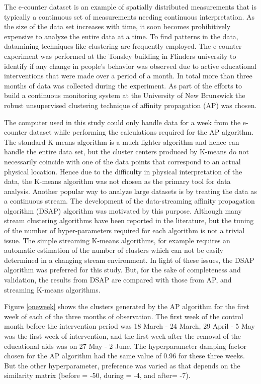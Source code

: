 The e-counter dataset is an example of spatially distributed measurements that is typically a continuous set of measurements needing continuous interpretation. As the size of the data set increases with time, it soon becomes prohibitively expensive to analyze the entire data at a time. To find patterns in the data, datamining techniques like clustering are frequently employed. The e-counter experiment was performed at the Tonsley building in Flinders university to identify if any change in people's behavior was observed due to active educational interventions that were made over a period of a month. In total more than three months of data was collected during the experiment. As part of the efforts to build a continuous monitoring system at the University of New Brunswick the robust unsupervised clustering technique of affinity propagation (AP) was chosen.

The computer used in this study could only handle data for a week from the e-counter dataset while performing the calculations required for the AP algorithm. The standard K-means algorithm is a much lighter algorithm and hence can handle the entire data set, but the cluster centers produced by K-means do not necessarily coincide with one of the data points that correspond to an actual physical location. Hence due to the difficulty in physical interpretation of the data, the K-means algorithm was not chosen as the primary tool for data analysis. Another popular way to analyze large datasets is by treating the data as a continuous stream. The development of the data-streaming affinity propagation algorithm (DSAP) algorithm was motivated by this purpose. Although many stream clustering algorithms have been reported in the literature, but the tuning of the number of hyper-parameters required for each algorithm is not a trivial issue. The simple streaming K-means algorithms, for example requires an automatic estimation of the number of clusters which can not be easily determined in a changing stream environment. In light of these issues, the DSAP algorithm was preferred for this study. But, for the sake of completeness and validation, the results from DSAP are compared with those from AP, and streaming K-means algorithms.   
    
Figure \ref{oneweek} shows the clusters generated by the AP algorithm for the first week of each of the three months of observation. The first week of the control month before the intervention period was 18 March - 24 March, 29 April - 5 May was the first week of intervention, and the first week after the removal of the educational aids was on 27 May - 2 June. The hyperparameter damping factor  chosen for the AP algorithm had the same value of 0.96 for these three weeks. But the other hyperparameter, preference was varied as that depends on the similarity matrix (before = -50, during = -4, and after= -7).

